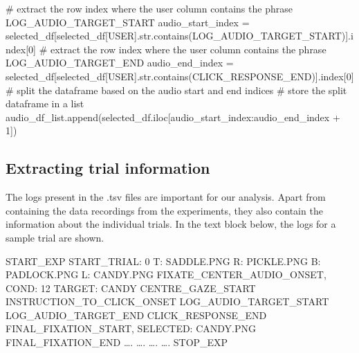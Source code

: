 \documentclass[
  a4paper,
]{article}
\newenvironment{Shaded}{}{}
\newcommand{\BuiltInTok}[1]{\textcolor[rgb]{0.84,0.23,0.29}{#1}}
\newcommand{\CommentTok}[1]{\textcolor[rgb]{0.42,0.45,0.49}{#1}}
\newcommand{\DecValTok}[1]{\textcolor[rgb]{0.00,0.36,0.77}{#1}}
\newcommand{\NormalTok}[1]{\textcolor[rgb]{0.14,0.16,0.18}{#1}}
\newcommand{\OperatorTok}[1]{\textcolor[rgb]{0.14,0.16,0.18}{#1}}
\newcommand{\StringTok}[1]{\textcolor[rgb]{0.01,0.18,0.38}{#1}}
\begin{document}
\begin{Shaded}
\begin{Highlighting}[]
\CommentTok{\# extract the row index where the user column contains the phrase \textquotesingle{}LOG\_AUDIO\_TARGET\_START\textquotesingle{}}
\NormalTok{audio\_start\_index }\OperatorTok{=}\NormalTok{ selected\_df[selected\_df[}\StringTok{\textquotesingle{}USER\textquotesingle{}}\NormalTok{].}\BuiltInTok{str}\NormalTok{.contains(}\StringTok{\textquotesingle{}LOG\_AUDIO\_TARGET\_START\textquotesingle{}}\NormalTok{)].index[}\DecValTok{0}\NormalTok{]}
\CommentTok{\# extract the row index where the user column contains the phrase \textquotesingle{}LOG\_AUDIO\_TARGET\_END\textquotesingle{}}
\NormalTok{audio\_end\_index }\OperatorTok{=}\NormalTok{ selected\_df[selected\_df[}\StringTok{\textquotesingle{}USER\textquotesingle{}}\NormalTok{].}\BuiltInTok{str}\NormalTok{.contains(}\StringTok{\textquotesingle{}CLICK\_RESPONSE\_END\textquotesingle{}}\NormalTok{)].index[}\DecValTok{0}\NormalTok{]}
\CommentTok{\# split the dataframe based on the audio start and end indices}
\CommentTok{\# store the split dataframe in a list}
\NormalTok{audio\_df\_list.append(selected\_df.iloc[audio\_start\_index:audio\_end\_index }\OperatorTok{+} \DecValTok{1}\NormalTok{])}
\end{Highlighting}
\end{Shaded}

\hypertarget{extracting-trial-information}{%
\subsection{Extracting trial
information}\label{extracting-trial-information}}

The logs present in the .tsv files are important for our analysis. Apart
from containing the data recordings from the experiments, they also
contain the information about the individual trials. In the text block
below, the logs for a sample trial are shown.

\begin{Shaded}
\begin{Highlighting}[]
\NormalTok{START\_EXP}
\NormalTok{START\_TRIAL: 0 T: SADDLE.PNG R: PICKLE.PNG B: PADLOCK.PNG L: CANDY.PNG}
\NormalTok{FIXATE\_CENTER\_AUDIO\_ONSET, COND: 12 TARGET: CANDY}
\NormalTok{CENTRE\_GAZE\_START}
\NormalTok{INSTRUCTION\_TO\_CLICK\_ONSET}
\NormalTok{LOG\_AUDIO\_TARGET\_START}
\NormalTok{LOG\_AUDIO\_TARGET\_END}
\NormalTok{CLICK\_RESPONSE\_END}
\NormalTok{FINAL\_FIXATION\_START, SELECTED: CANDY.PNG}
\NormalTok{FINAL\_FIXATION\_END}
\NormalTok{….}
\NormalTok{….}
\NormalTok{….}
\NormalTok{….}
\NormalTok{STOP\_EXP}
\end{Highlighting}
\end{Shaded}
\end{document}
